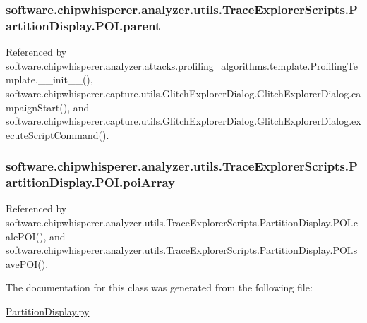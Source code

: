\subsubsection[{parent}]{\setlength{\rightskip}{0pt plus 5cm}software.\+chipwhisperer.\+analyzer.\+utils.\+Trace\+Explorer\+Scripts.\+Partition\+Display.\+P\+O\+I.\+parent}\label{classsoftware_1_1chipwhisperer_1_1analyzer_1_1utils_1_1TraceExplorerScripts_1_1PartitionDisplay_1_1POI_a5365ab9885cd9f79ca294ebd0a48fdda}


Referenced by software.\+chipwhisperer.\+analyzer.\+attacks.\+profiling\+\_\+algorithms.\+template.\+Profiling\+Template.\+\_\+\+\_\+init\+\_\+\+\_\+(), software.\+chipwhisperer.\+capture.\+utils.\+Glitch\+Explorer\+Dialog.\+Glitch\+Explorer\+Dialog.\+campaign\+Start(), and software.\+chipwhisperer.\+capture.\+utils.\+Glitch\+Explorer\+Dialog.\+Glitch\+Explorer\+Dialog.\+execute\+Script\+Command().

\hypertarget{classsoftware_1_1chipwhisperer_1_1analyzer_1_1utils_1_1TraceExplorerScripts_1_1PartitionDisplay_1_1POI_adbe8e862b81ccc918b44d82cb1f3fe6d}{}
\subsubsection[{poi\+Array}]{\setlength{\rightskip}{0pt plus 5cm}software.\+chipwhisperer.\+analyzer.\+utils.\+Trace\+Explorer\+Scripts.\+Partition\+Display.\+P\+O\+I.\+poi\+Array}\label{classsoftware_1_1chipwhisperer_1_1analyzer_1_1utils_1_1TraceExplorerScripts_1_1PartitionDisplay_1_1POI_adbe8e862b81ccc918b44d82cb1f3fe6d}


Referenced by software.\+chipwhisperer.\+analyzer.\+utils.\+Trace\+Explorer\+Scripts.\+Partition\+Display.\+P\+O\+I.\+calc\+P\+O\+I(), and software.\+chipwhisperer.\+analyzer.\+utils.\+Trace\+Explorer\+Scripts.\+Partition\+Display.\+P\+O\+I.\+save\+P\+O\+I().



The documentation for this class was generated from the following file\+:\begin{DoxyCompactItemize}
\item 
\hyperlink{PartitionDisplay_8py}{Partition\+Display.\+py}\end{DoxyCompactItemize}
